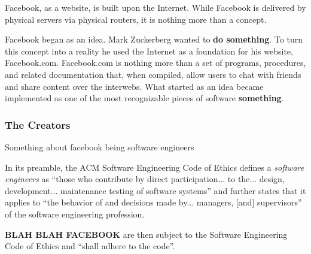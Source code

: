 \par Facebook, as a website, is built upon the Internet. \citeneeded While Facebook is delivered by physical servers via physical routers, it is nothing more than a concept. 


\par Facebook began as an idea. Mark Zuckerberg wanted to \textbf{do something}. \citeneeded To turn this concept into a reality he used the Internet as a foundation for his website, Facebook.com. Facebook.com is nothing more than a set of programs, procedures, and related documentation that, when compiled, allow users to chat with friends and share content over the interwebs. What started as an idea became implemented as one of the most recognizable pieces of software \textbf{something}. \citeneeded


\subsubsection{The Creators}

% 
\par 

\par Something about facebook being software engineers

\par In its preamble, the ACM Software Engineering Code of Ethics defines a \emph{software engineers} as ``those who contribute by direct participation... to the... design, development... maintenance testing of software systems'' and further states that it applies to ``the behavior of and decisions made by... managers, [and] supervisors'' of the software engineering profession.

\par \textbf{BLAH BLAH FACEBOOK} are then subject to the Software Engineering Code of Ethics and ``shall adhere to the code''. \cite{se_code}